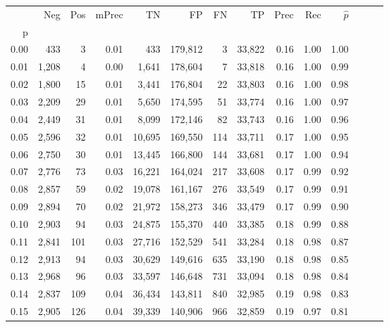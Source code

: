 \begin{tabular}{rrrrrrrrrrrrrr}
\toprule
{} &    Neg &  Pos & mPrec &       TN &       FP &      FN &      TP &  Prec &   Rec & $\hat{p}$ \\
p    &        &      &       &          &          &         &         &       &       &           \\
\midrule
0.00 &    433 &    3 &  0.01 &      433 &  179,812 &       3 &  33,822 &  0.16 &  1.00 &      1.00 \\
0.01 &  1,208 &    4 &  0.00 &    1,641 &  178,604 &       7 &  33,818 &  0.16 &  1.00 &      0.99 \\
0.02 &  1,800 &   15 &  0.01 &    3,441 &  176,804 &      22 &  33,803 &  0.16 &  1.00 &      0.98 \\
0.03 &  2,209 &   29 &  0.01 &    5,650 &  174,595 &      51 &  33,774 &  0.16 &  1.00 &      0.97 \\
0.04 &  2,449 &   31 &  0.01 &    8,099 &  172,146 &      82 &  33,743 &  0.16 &  1.00 &      0.96 \\
0.05 &  2,596 &   32 &  0.01 &   10,695 &  169,550 &     114 &  33,711 &  0.17 &  1.00 &      0.95 \\
0.06 &  2,750 &   30 &  0.01 &   13,445 &  166,800 &     144 &  33,681 &  0.17 &  1.00 &      0.94 \\
0.07 &  2,776 &   73 &  0.03 &   16,221 &  164,024 &     217 &  33,608 &  0.17 &  0.99 &      0.92 \\
0.08 &  2,857 &   59 &  0.02 &   19,078 &  161,167 &     276 &  33,549 &  0.17 &  0.99 &      0.91 \\
0.09 &  2,894 &   70 &  0.02 &   21,972 &  158,273 &     346 &  33,479 &  0.17 &  0.99 &      0.90 \\
0.10 &  2,903 &   94 &  0.03 &   24,875 &  155,370 &     440 &  33,385 &  0.18 &  0.99 &      0.88 \\
0.11 &  2,841 &  101 &  0.03 &   27,716 &  152,529 &     541 &  33,284 &  0.18 &  0.98 &      0.87 \\
0.12 &  2,913 &   94 &  0.03 &   30,629 &  149,616 &     635 &  33,190 &  0.18 &  0.98 &      0.85 \\
0.13 &  2,968 &   96 &  0.03 &   33,597 &  146,648 &     731 &  33,094 &  0.18 &  0.98 &      0.84 \\
0.14 &  2,837 &  109 &  0.04 &   36,434 &  143,811 &     840 &  32,985 &  0.19 &  0.98 &      0.83 \\
0.15 &  2,905 &  126 &  0.04 &   39,339 &  140,906 &     966 &  32,859 &  0.19 &  0.97 &      0.81 \\

\end{tabular}
